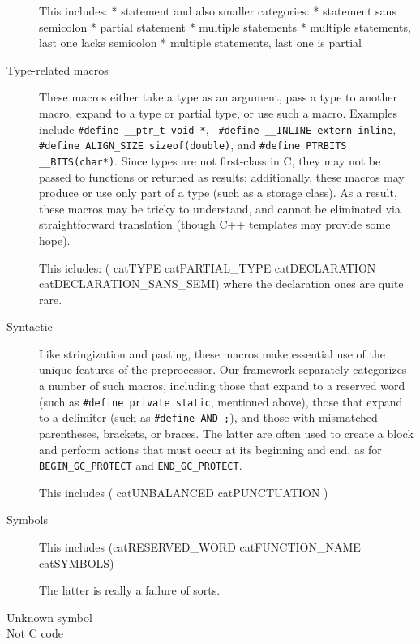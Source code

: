 \begin{description}
  This includes:
    * statement
  and also smaller categories:
    * statement sans semicolon
    * partial statement
    * multiple statements
    * multiple statements, last one lacks semicolon
    * multiple statements, last one is partial

\item[Type-related macros]  These macros either take a type as an argument, pass
  a type to another macro, expand to a type or partial type, or use such a
  macro.  Examples include {\tt \#define \verb|__ptr_t| void *}, {\tt
  \#define \verb|__INLINE| extern inline}, {\tt \#define \verb|ALIGN_SIZE|
  sizeof(double)}, and {\tt \#define PTRBITS \verb|__BITS|(char*)}.  Since
  types are not first-class in C, they may not be passed to functions or
  returned as results; additionally, these macros may produce or use only
  part of a type (such as a storage class).  As a result, these macros may be
  tricky to understand, and cannot be eliminated via straightforward
  translation (though C++ templates may provide some hope).

    This icludes:
  ( catTYPE catPARTIAL_TYPE catDECLARATION catDECLARATION_SANS_SEMI)
  where the declaration ones are quite rare.

\item[Syntactic]  Like stringization and pasting, these
  macros make essential use of the unique features of the preprocessor.
  Our framework separately categorizes a number of such macros, including
  those that expand to a reserved word (such as {\tt \#define private
  static}, mentioned above), those that expand to a delimiter (such as
{\tt \#define AND ;}), and those with mismatched parentheses, brackets, or
braces.  The latter are often used to create a block and perform actions
that must occur at its beginning and end, as for \verb|BEGIN_GC_PROTECT|
and \verb|END_GC_PROTECT|.

This includes ( catUNBALANCED catPUNCTUATION )

\item[Symbols]

This includes (catRESERVED_WORD catFUNCTION_NAME catSYMBOLS)

The latter is really a failure of sorts.

\item[Unknown symbol]



\item[Not C code]







\end{description}

